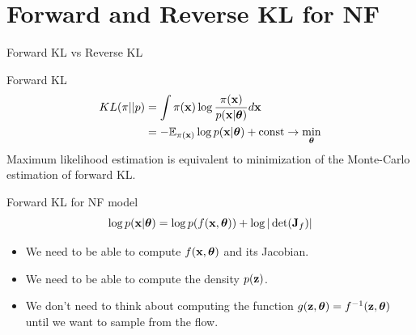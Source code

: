 \section{Forward and Reverse KL for NF}
\begin{frame}{Forward KL vs Reverse KL}
	\begin{block}{Forward KL}
		\vspace{-0.5cm}
		\begin{align*}
			KL(\pi || p) &= \int \pi (\mathbf{x}) \log \frac{\pi(\mathbf{x})}{p(\mathbf{x} | \boldsymbol{\theta})} d \mathbf{x} \\
			&= - \mathbb{E}_{\pi(\mathbf{x})} \log p(\mathbf{x} | \boldsymbol{\theta}) + \text{const} \rightarrow \min_{\boldsymbol{\theta}}
		\end{align*}
		Maximum likelihood estimation is equivalent to minimization of the Monte-Carlo estimation of forward KL.
	\end{block}
	\begin{block}{Forward KL for NF model}
	    \vspace{-0.1cm}
		\[
			\log p(\mathbf{x}|\boldsymbol{\theta}) = \log p(f(\mathbf{x}, \boldsymbol{\theta})) + \log  |\det (\mathbf{J}_f)|
		\]
		\vspace{-0.2cm}
		\begin{itemize}
			\item We need to be able to compute $f(\mathbf{x}, \boldsymbol{\theta})$ and its Jacobian.
			\item We need to be able to compute the density $p(\mathbf{z})$.
			\item We don’t need to think about computing the function $g(\mathbf{z}, \boldsymbol{\theta}) = f^{-1}(\mathbf{z}, \boldsymbol{\theta})$ until we want to sample from the flow.
		\end{itemize}
	\end{block}
\end{frame}
